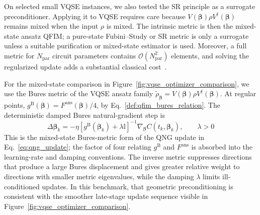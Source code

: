 On selected small VQSE instances, we also tested the SR principle as a surrogate preconditioner. Applying it to VQSE requires care because $V(\boldsymbol{\beta})\rho V^\dagger(\boldsymbol{\beta})$ remains mixed when the input $\rho$ is mixed. The intrinsic metric is then the mixed-state ansatz QFIM; a pure-state Fubini--Study or SR metric is only a surrogate unless a suitable purification or mixed-state estimator is used. Moreover, a full metric for $N_{\mathrm{par}}$ circuit parameters contains $\mathcal{O}(N_{\mathrm{par}}^2)$ elements, and solving the regularized update adds a substantial classical cost~\cite{kolotouros2024RNG,gacon2021_perturbation_stochastic_qfi}.

For the mixed-state comparison in Figure~\ref{fig:vqse_optimizer_comparison}, we use the Bures metric of the VQSE ansatz family
$\widetilde{\rho}_{\boldsymbol{\beta}}=V(\boldsymbol{\beta})\rho V^\dagger(\boldsymbol{\beta})$. At regular points,
$g^{\mathrm B}(\boldsymbol{\beta})=F^{\mathrm{ans}}(\boldsymbol{\beta})/4$, by Eq.~\eqref{def:qfim_bures_relation}. The deterministic damped Bures natural-gradient step is
\begin{equation}
    \Delta\boldsymbol{\beta}_k
    =-\eta\left[
        g^{\mathrm B}(\boldsymbol{\beta}_k)+\lambda\mathbb{I}
        \right]^{-1}
    \nabla_{\boldsymbol{\beta}}C(t_k,\boldsymbol{\beta}_k),
    \qquad \lambda>0
    \label{eq:vqse_bures_natural_gradient}
\end{equation}
This is the mixed-state Bures-metric form of the QNG update in Eq.~\eqref{eq:qng_update}; the factor of four relating $g^{\mathrm B}$ and $F^{\mathrm{ans}}$ is absorbed into the learning-rate and damping conventions. The inverse metric suppresses directions that produce a large Bures displacement and gives greater relative weight to directions with smaller metric eigenvalues, while the damping $\lambda$ limits ill-conditioned updates. In this benchmark, that geometric preconditioning is consistent with the smoother late-stage update sequence visible in Figure~\ref{fig:vqse_optimizer_comparison}.

